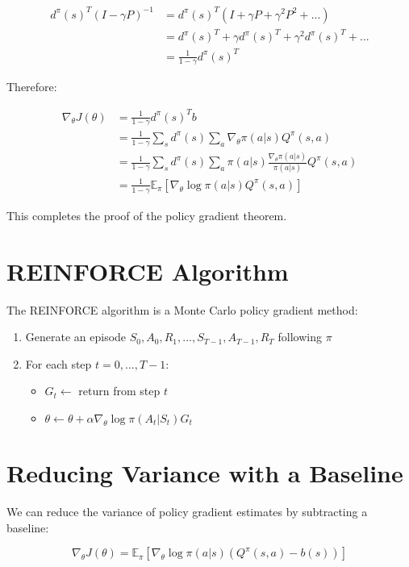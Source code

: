 \documentclass{article}
\begin{document}
\begin{align}
    d^\pi(s)^T(I - \gamma P)^{-1} &= d^\pi(s)^T(I + \gamma P + \gamma^2 P^2 + ...) \\
    &= d^\pi(s)^T + \gamma d^\pi(s)^T + \gamma^2 d^\pi(s)^T + ... \\
    &= \frac{1}{1-\gamma}d^\pi(s)^T
\end{align}

Therefore:

\begin{align}
    \nabla_\theta J(\theta) &= \frac{1}{1-\gamma}d^\pi(s)^T b \\
    &= \frac{1}{1-\gamma}\sum_s d^\pi(s)\sum_a \nabla_\theta \pi(a|s)Q^\pi(s,a) \\
    &= \frac{1}{1-\gamma}\sum_s d^\pi(s)\sum_a \pi(a|s)\frac{\nabla_\theta \pi(a|s)}{\pi(a|s)}Q^\pi(s,a) \\
    &= \frac{1}{1-\gamma}\mathbb{E}_\pi[\nabla_\theta \log \pi(a|s) Q^\pi(s,a)]
\end{align}

This completes the proof of the policy gradient theorem.

\section{REINFORCE Algorithm}

The REINFORCE algorithm is a Monte Carlo policy gradient method:

\begin{enumerate}
    \item Generate an episode $S_0, A_0, R_1, ..., S_{T-1}, A_{T-1}, R_T$ following $\pi$
    \item For each step $t = 0, ..., T-1$:
        \begin{itemize}
            \item $G_t \leftarrow$ return from step $t$
            \item $\theta \leftarrow \theta + \alpha \nabla_\theta \log \pi(A_t|S_t) G_t$
        \end{itemize}
\end{enumerate}

\section{Reducing Variance with a Baseline}

We can reduce the variance of policy gradient estimates by subtracting a baseline:

\begin{equation}
    \nabla_\theta J(\theta) = \mathbb{E}_\pi[\nabla_\theta \log \pi(a|s) (Q^\pi(s,a) - b(s))]
\end{equation}
\end{document}
